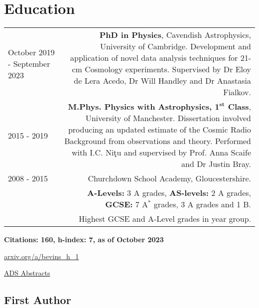 \documentclass{article}
\begin{document}
\section*{Education}
\begin{tabular}{L!{\vrule}R}
	October 2019 - September 2023 & \textbf{PhD in Physics}, Cavendish Astrophysics, University of Cambridge. Development and application of novel data analysis techniques for 21-cm Cosmology experiments. Supervised by Dr Eloy de Lera Acedo, Dr Will Handley and Dr Anastasia Fialkov. \\
	2015 - 2019 & \textbf{M.Phys. Physics with Astrophysics, $\mathbf{1^{st}}$ Class}, University of Manchester. Dissertation involved producing an updated estimate of the Cosmic Radio Background from observations and theory. Performed with I.C. Ni\c{t}u and supervised by Prof. Anna Scaife and Dr Justin Bray. \\
	2008 - 2015 & Churchdown School Academy, Gloucestershire. \\ &\textbf{A-Levels:} 3 A grades, \textbf{AS-levels:} 2 A grades, \textbf{GCSE:} 7 A$^*$ grades, 3 A grades and 1 B. \\ & Highest GCSE and A-Level grades in year group.
\end{tabular}

 \hfill \textbf{Citations: 160, h-index: 7, as of October 2023}

\hfill \href{http://arxiv.org/a/bevins_h_1}{arxiv.org/a/bevins\_h\_1}

\hfill \href{https://ui.adsabs.harvard.edu/search/p_=0&q=author\%3A\%22Bevins\%2C\%20H.\%20T.\%20J.\%22&sort=date\%20desc\%2C\%20bibcode\%20desc}{ADS Abstracts}

\subsection*{First Author}
\end{document}

